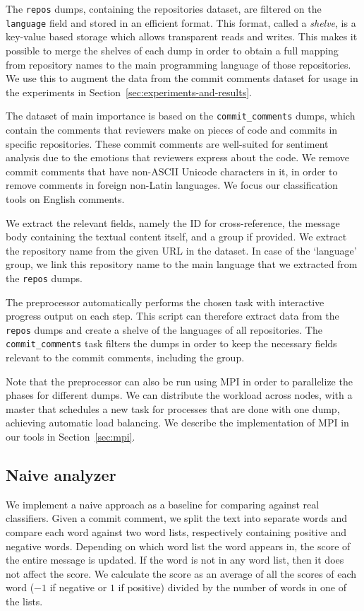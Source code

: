 \documentclass{article}
\begin{document}
The {\tt repos} dumps, containing the repositories dataset, are filtered on the 
{\tt language} field and stored in an efficient format. This format, called a
\emph{shelve}, is a key-value based storage which allows transparent reads and 
writes. This makes it possible to merge the shelves of each dump in order to 
obtain a full mapping from repository names to the main programming language of 
those repositories. We use this to augment the data from the commit comments
dataset for usage in the experiments in Section~\ref{sec:experiments-and-results}.

The dataset of main importance is based on the {\tt commit\_comments} dumps, 
which contain the comments that reviewers make on pieces of code and commits in 
specific repositories. These commit comments are well-suited for sentiment 
analysis due to the emotions that reviewers express about the code. We remove
commit comments that have non-ASCII Unicode characters in it, in order to
remove comments in foreign non-Latin languages. We focus our classification
tools on English comments.

We extract the relevant fields, namely the ID for cross-reference, the message 
body containing the textual content itself, and a group if provided. We extract 
the repository name from the given URL in the dataset. In case of the 
`language' group, we link this repository name to the main language that we 
extracted from the {\tt repos} dumps.

The preprocessor automatically performs the chosen task with interactive 
progress output on each step. This script can therefore extract data from the
{\tt repos} dumps and create a shelve of the languages of all repositories. The
{\tt commit\_comments} task filters the dumps in order to keep the necessary
fields relevant to the commit comments, including the group.

Note that the preprocessor can also be run using MPI in order to parallelize 
the phases for different dumps. We can distribute the workload across nodes, 
with a master that schedules a new task for processes that are done with one 
dump, achieving automatic load balancing. We describe the implementation of MPI 
in our tools in Section~\ref{sec:mpi}.

\subsection{Naive analyzer}\label{sec:analyzer}
We implement a naive approach as a baseline for comparing against real 
classifiers. Given a commit comment, we split the text into separate words and 
compare each word against two word lists, respectively containing positive and 
negative words. Depending on which word list the word appears in, the score of 
the entire message is updated. If the word is not in any word list, then it 
does not affect the score. We calculate the score as an average of all the 
scores of each word ($-1$ if negative or $1$ if positive) divided by the number 
of words in one of the lists.
\end{document}
